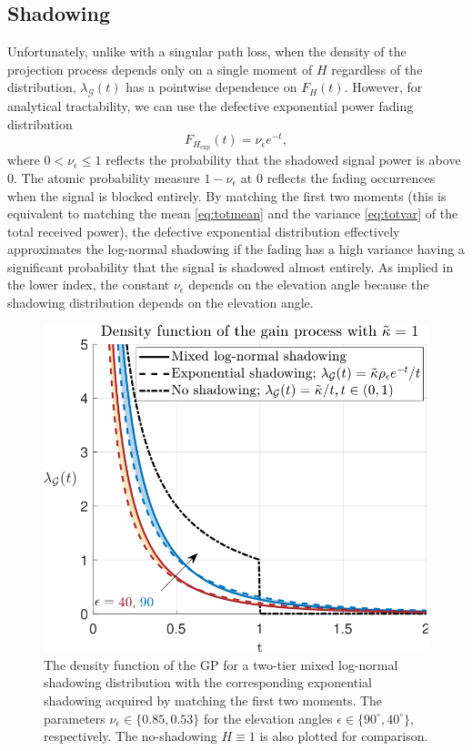 \documentclass[lettersize,journal]{IEEEtran}
\begin{document}
\subsection{Shadowing}
Unfortunately, unlike with a singular path loss, when the density of the projection process depends only on a single moment of $H$ regardless of the distribution, $\lambda_{\mathcal{G}}(t)$ has a pointwise dependence on $F_H(t)$. However, for analytical tractability, we can use the defective exponential power fading distribution
\begin{equation}
  \label{eq:defexp}
  F_{{H}_{\text{exp}}}(t)=\nu_{\epsilon} e^{- t},
\end{equation}
where $0<\nu_{\epsilon} \leq 1$ reflects the probability that the shadowed signal power is above $0$. The atomic probability measure $1-\nu_{\epsilon}$ at $0$ reflects the fading occurrences when the signal is blocked entirely. By matching the first two moments (this is equivalent to matching the mean \eqref{eq:totmean} and the variance \eqref{eq:totvar} of the total received power), the defective exponential distribution effectively approximates the log-normal shadowing if the fading has a high variance having a significant probability that the signal is shadowed almost entirely. As implied in the lower index, the constant $\nu_{\epsilon}$ depends on the elevation angle because the shadowing distribution depends on the elevation angle.

         \begin{figure}[h]
           \centering
           \includegraphics[width=\linewidth]{plotdensities.pdf}
           \caption{The density function of the GP for a two-tier mixed log-normal shadowing distribution with the corresponding exponential shadowing acquired by matching the first two moments. The parameters $\nu_{\epsilon} \in \{0.85,0.53\}$ for the elevation angles $\epsilon \in \{90^{\circ},40^{\circ}\}$, respectively. The no-shadowing $H\equiv 1$ is also plotted for comparison.} 
           \label{fig:plotdensities}
         \end{figure}
\end{document}
